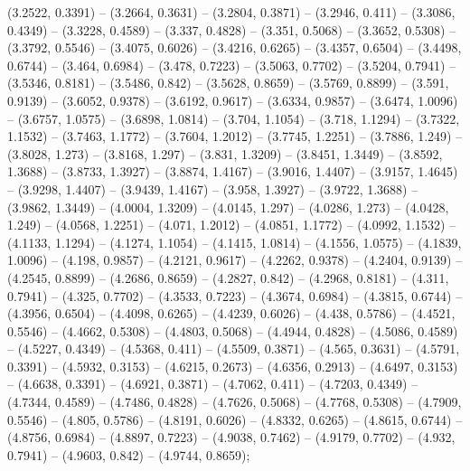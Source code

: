 (3.2522, 0.3391) -- (3.2664, 0.3631) -- (3.2804, 0.3871) -- (3.2946, 0.411) -- (3.3086, 0.4349) -- (3.3228, 0.4589) -- (3.337, 0.4828) -- (3.351, 0.5068) -- (3.3652, 0.5308) -- (3.3792, 0.5546) -- (3.4075, 0.6026) -- (3.4216, 0.6265) -- (3.4357, 0.6504) -- (3.4498, 0.6744) -- (3.464, 0.6984) -- (3.478, 0.7223) -- (3.5063, 0.7702) -- (3.5204, 0.7941) -- (3.5346, 0.8181) -- (3.5486, 0.842) -- (3.5628, 0.8659) -- (3.5769, 0.8899) -- (3.591, 0.9139) -- (3.6052, 0.9378) -- (3.6192, 0.9617) -- (3.6334, 0.9857) -- (3.6474, 1.0096) -- (3.6757, 1.0575) -- (3.6898, 1.0814) -- (3.704, 1.1054) -- (3.718, 1.1294) -- (3.7322, 1.1532) -- (3.7463, 1.1772) -- (3.7604, 1.2012) -- (3.7745, 1.2251) -- (3.7886, 1.249) -- (3.8028, 1.273) -- (3.8168, 1.297) -- (3.831, 1.3209) -- (3.8451, 1.3449) -- (3.8592, 1.3688) -- (3.8733, 1.3927) -- (3.8874, 1.4167) -- (3.9016, 1.4407) -- (3.9157, 1.4645) -- (3.9298, 1.4407) -- (3.9439, 1.4167) -- (3.958, 1.3927) -- (3.9722, 1.3688) -- (3.9862, 1.3449) -- (4.0004, 1.3209) -- (4.0145, 1.297) -- (4.0286, 1.273) -- (4.0428, 1.249) -- (4.0568, 1.2251) -- (4.071, 1.2012) -- (4.0851, 1.1772) -- (4.0992, 1.1532) -- (4.1133, 1.1294) -- (4.1274, 1.1054) -- (4.1415, 1.0814) -- (4.1556, 1.0575) -- (4.1839, 1.0096) -- (4.198, 0.9857) -- (4.2121, 0.9617) -- (4.2262, 0.9378) -- (4.2404, 0.9139) -- (4.2545, 0.8899) -- (4.2686, 0.8659) -- (4.2827, 0.842) -- (4.2968, 0.8181) -- (4.311, 0.7941) -- (4.325, 0.7702) -- (4.3533, 0.7223) -- (4.3674, 0.6984) -- (4.3815, 0.6744) -- (4.3956, 0.6504) -- (4.4098, 0.6265) -- (4.4239, 0.6026) -- (4.438, 0.5786) -- (4.4521, 0.5546) -- (4.4662, 0.5308) -- (4.4803, 0.5068) -- (4.4944, 0.4828) -- (4.5086, 0.4589) -- (4.5227, 0.4349) -- (4.5368, 0.411) -- (4.5509, 0.3871) -- (4.565, 0.3631) -- (4.5791, 0.3391) -- (4.5932, 0.3153) -- (4.6215, 0.2673) -- (4.6356, 0.2913) -- (4.6497, 0.3153) -- (4.6638, 0.3391) -- (4.6921, 0.3871) -- (4.7062, 0.411) -- (4.7203, 0.4349) -- (4.7344, 0.4589) -- (4.7486, 0.4828) -- (4.7626, 0.5068) -- (4.7768, 0.5308) -- (4.7909, 0.5546) -- (4.805, 0.5786) -- (4.8191, 0.6026) -- (4.8332, 0.6265) -- (4.8615, 0.6744) -- (4.8756, 0.6984) -- (4.8897, 0.7223) -- (4.9038, 0.7462) -- (4.9179, 0.7702) -- (4.932, 0.7941) -- (4.9603, 0.842) -- (4.9744, 0.8659);



